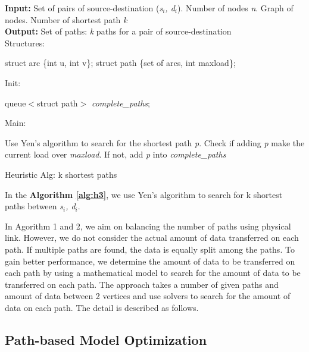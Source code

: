 \begin{algorithm}[!htp]
\textbf{Input:} Set of pairs of source-destination (\textit{s$_i$, d$_i$}). Number of nodes \textit{n}. Graph of nodes. Number of shortest path \textit{k}\\
\textbf{Output:} Set of paths: \textit{k} paths for a pair of source-destination\\
Structures:
    \begin{algorithmic}
        \State struct arc \{int u, int v\};
        \State struct path \{set of arcs, int maxload\};
    \end{algorithmic}

Init:
    \begin{algorithmic}
        \State queue$<$struct path$>$ \textit{complete\_paths};
    \end{algorithmic}
Main:
\begin{algorithmic}
		\State Use Yen's algorithm to search for the shortest path \textit{p}.
		\State Check if adding \textit{p} make the current load over \textit{maxload}.
		\State If not, add \textit{p} into \textit{complete\_paths}
	    \EndWhile
	\EndFor
    \EndFunction
\end{algorithmic}

\caption{Heuristic Alg: k shortest paths}
\label{alg:h2}

\end{algorithm}

In the \textbf{Algorithm \ref{alg:h3}}, we use Yen's algorithm to search for k shortest paths between \textit{s$_i$, d$_i$}.

In Agorithm 1 and 2, we aim on balancing the number of paths using physical link. However, we do not consider the actual amount of data transferred on each path. If multiple paths are found, the data is equally split among the paths. To gain better performance, we determine the amount of data to be transferred on each path by using a mathematical model to search for the amount of data to be transferred on each path. The approach takes a number of given paths and amount of data between 2 vertices and use solvers to search for the amount of data on each path. The detail is described as follows.

\subsection{Path-based Model Optimization}

